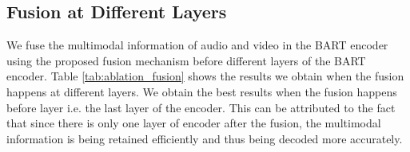 \documentclass[11pt]{article}
\begin{document}
\begin{table}[h!]
\centering
{}
\caption{Cosine distance between three random samples from the dataset before and after fine-tuning. (PT: pre-trained; FT: fine-tuned)}
\label{tab:embed_cosine}
\end{table}

\subsection{Fusion at Different Layers}
\label{sec:app_fusion}
We fuse the multimodal information of audio and video in the BART encoder using the proposed fusion mechanism before different layers of the BART encoder. Table \ref{tab:ablation_fusion} shows the results we obtain when the fusion happens at different layers. We obtain the best results when the fusion happens before layer  i.e. the last layer of the encoder. This can be attributed to the fact that since there is only one layer of encoder after the fusion, the multimodal information is being retained efficiently and thus being decoded more accurately.
\begin{table}[h!]
\centering
{}
\caption{ROUGE scores for fusion before different layers (R1/2/L: ROUGE1/2/L).}
\label{tab:ablation_fusion}
\end{table} 
\end{document}
